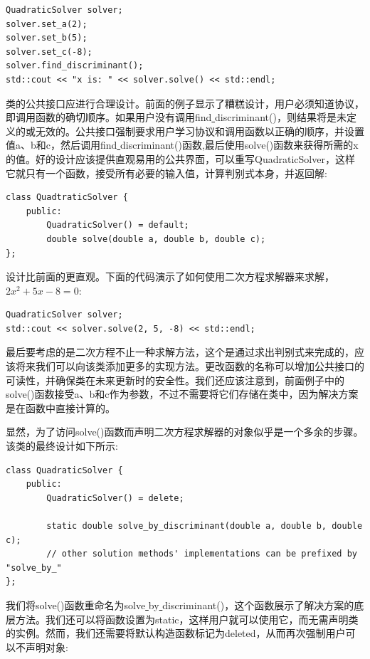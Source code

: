 \begin{lstlisting}[caption={}]
QuadraticSolver solver;
solver.set_a(2);
solver.set_b(5);
solver.set_c(-8);
solver.find_discriminant();
std::cout << "x is: " << solver.solve() << std::endl;
\end{lstlisting}

类的公共接口应进行合理设计。前面的例子显示了糟糕设计，用户必须知道协议，即调用函数的确切顺序。如果用户没有调用find\underline{ }discriminant()，则结果将是未定义的或无效的。公共接口强制要求用户学习协议和调用函数以正确的顺序，并设置值a、b和c，然后调用find\underline{ }discriminant()函数,最后使用solve()函数来获得所需的x的值。好的设计应该提供直观易用的公共界面，可以重写QuadraticSolver，这样它就只有一个函数，接受所有必要的输入值，计算判别式本身，并返回解: \par

\begin{lstlisting}[caption={}]
class QuadtraticSolver {
	public:
		QuadraticSolver() = default;
		double solve(double a, double b, double c);
};
\end{lstlisting}

设计比前面的更直观。下面的代码演示了如何使用二次方程求解器来求解，$2x^2 + 5x - 8 = 0$: \par

\begin{lstlisting}[caption={}]
QuadraticSolver solver;
std::cout << solver.solve(2, 5, -8) << std::endl;
\end{lstlisting}

最后要考虑的是二次方程不止一种求解方法，这个是通过求出判别式来完成的，应该将来我们可以向该类添加更多的实现方法。更改函数的名称可以增加公共接口的可读性，并确保类在未来更新时的安全性。我们还应该注意到，前面例子中的solve()函数接受a、b和c作为参数，不过不需要将它们存储在类中，因为解决方案是在函数中直接计算的。 \par
显然，为了访问solve()函数而声明二次方程求解器的对象似乎是一个多余的步骤。该类的最终设计如下所示: \par

\begin{lstlisting}[caption={}]
class QuadraticSolver {
	public:
		QuadraticSolver() = delete;
		
		static double solve_by_discriminant(double a, double b, double c);
		// other solution methods' implementations can be prefixed by "solve_by_"
};
\end{lstlisting}

我们将solve()函数重命名为solve\underline{ }by\underline{ }discriminant()，这个函数展示了解决方案的底层方法。我们还可以将函数设置为static，这样用户就可以使用它，而无需声明类的实例。然而，我们还需要将默认构造函数标记为deleted，从而再次强制用户可以不声明对象: \par

